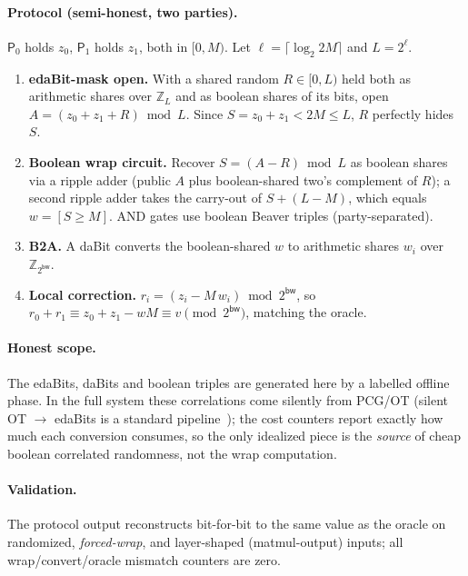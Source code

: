 \documentclass[11pt]{article}
\newcommand{\Z}{\mathbb{Z}}
\newcommand{\ServerZero}{\mathsf{P}_0}
\newcommand{\ServerOne}{\mathsf{P}_1}
\newcommand{\modtwo}{\Z_{2^{\mathsf{bw}}}}
\begin{document}
\paragraph{Protocol (semi-honest, two parties).} $\ServerZero$ holds $z_0$,
$\ServerOne$ holds $z_1$, both in $[0,M)$. Let $\ell=\lceil\log_2 2M\rceil$ and
$L=2^\ell$.
\begin{enumerate}[leftmargin=*]
  \item \textbf{edaBit-mask open.} With a shared random $R\in[0,L)$ held both as
  arithmetic shares over $\Z_L$ and as boolean shares of its bits, open
  $A=(z_0+z_1+R)\bmod L$. Since $S=z_0+z_1<2M\le L$, $R$ perfectly hides $S$.
  \item \textbf{Boolean wrap circuit.} Recover $S=(A-R)\bmod L$ as boolean shares
  via a ripple adder (public $A$ plus boolean-shared two's complement of $R$); a
  second ripple adder takes the carry-out of $S+(L-M)$, which equals
  $w=[S\ge M]$. AND gates use boolean Beaver triples (party-separated).
  \item \textbf{B2A.} A daBit converts the boolean-shared $w$ to arithmetic shares
  $w_i$ over $\modtwo$.
  \item \textbf{Local correction.} $r_i=(z_i-M\,w_i)\bmod 2^{\mathsf{bw}}$, so
  $r_0+r_1\equiv z_0+z_1-wM\equiv v\pmod{2^{\mathsf{bw}}}$, matching the oracle.
\end{enumerate}

\paragraph{Honest scope.} The edaBits, daBits and boolean triples are generated
here by a labelled offline phase. In the full system these correlations come
silently from PCG/OT (silent OT $\to$ edaBits is a standard
pipeline~\cite{escudero2020edabits,boyle2019pcg}); the cost counters report
exactly how much each conversion consumes, so the only idealized piece is the
\emph{source} of cheap boolean correlated randomness, not the wrap computation.

\paragraph{Validation.} The protocol output reconstructs bit-for-bit to the same
value as the oracle on randomized, \emph{forced-wrap}, and layer-shaped
(matmul-output) inputs; all wrap/convert/oracle mismatch counters are zero.
\end{document}
